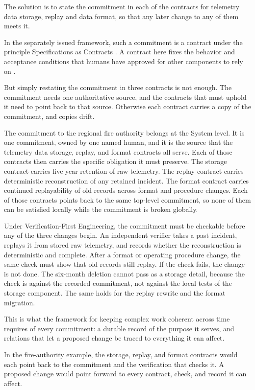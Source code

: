 The solution is to state the commitment in each of the contracts for telemetry data storage, replay and data format, so that any later change to any of them meets it.

In the separately issued framework, such a commitment is a contract under the principle Specifications as Contracts \citep{tbf2026}. A contract here fixes the behavior and acceptance conditions that humans have approved for other components to rely on \citep[Section~\hyperlink{nss-2}{2}]{pss2026}.

But simply restating the commitment in three contracts is not enough. The commitment needs one authoritative source, and the contracts that must uphold it need to point back to that source. Otherwise each contract carries a copy of the commitment, and copies drift.

The commitment to the regional fire authority belongs at the System level. It is one commitment, owned by one named human, and it is the source that the telemetry data storage, replay, and format contracts all serve. Each of those contracts then carries the specific obligation it must preserve. The storage contract carries five-year retention of raw telemetry. The replay contract carries deterministic reconstruction of any retained incident. The format contract carries continued replayability of old records across format and procedure changes. Each of those contracts points back to the same top-level commitment, so none of them can be satisfied locally while the commitment is broken globally.

Under Verification-First Engineering, the commitment must be checkable before any of the three changes begin. An independent verifier takes a past incident, replays it from stored raw telemetry, and records whether the reconstruction is deterministic and complete. After a format or operating procedure change, the same check must show that old records still replay. If the check fails, the change is not done. The six-month deletion cannot pass as a storage detail, because the check is against the recorded commitment, not against the local tests of the storage component. The same holds for the replay rewrite and the format migration.

This is what the framework for keeping complex work coherent across time requires of every commitment: a durable record of the purpose it serves, and relations that let a proposed change be traced to everything it can affect.

In the fire-authority example, the storage, replay, and format contracts would each point back to the commitment and the verification that checks it. A proposed change would point forward to every contract, check, and record it can affect.

